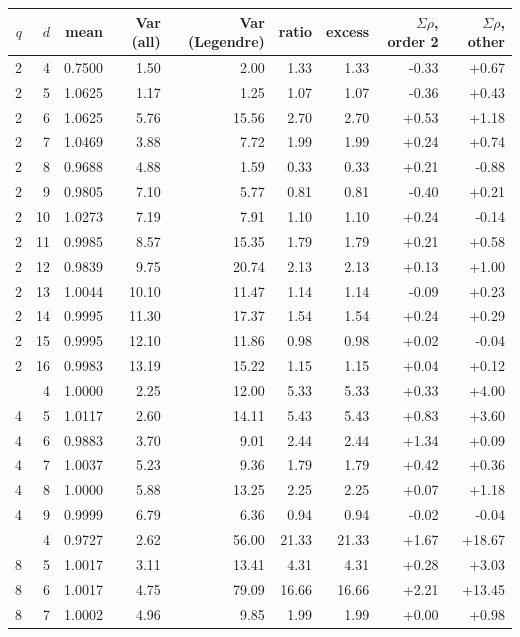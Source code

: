\begin{tabular}{rrrrrrrrr}
\toprule
$q$ & $d$ & mean & Var (all) & Var (Legendre) & ratio & excess & $\Sigma\rho$, order 2 & $\Sigma\rho$, other \\
\midrule
2 & 4 & 0.7500 & 1.50 & 2.00 & 1.33 & 1.33 & -0.33 & +0.67 \\
2 & 5 & 1.0625 & 1.17 & 1.25 & 1.07 & 1.07 & -0.36 & +0.43 \\
2 & 6 & 1.0625 & 5.76 & 15.56 & 2.70 & 2.70 & +0.53 & +1.18 \\
2 & 7 & 1.0469 & 3.88 & 7.72 & 1.99 & 1.99 & +0.24 & +0.74 \\
2 & 8 & 0.9688 & 4.88 & 1.59 & 0.33 & 0.33 & +0.21 & -0.88 \\
2 & 9 & 0.9805 & 7.10 & 5.77 & 0.81 & 0.81 & -0.40 & +0.21 \\
2 & 10 & 1.0273 & 7.19 & 7.91 & 1.10 & 1.10 & +0.24 & -0.14 \\
2 & 11 & 0.9985 & 8.57 & 15.35 & 1.79 & 1.79 & +0.21 & +0.58 \\
2 & 12 & 0.9839 & 9.75 & 20.74 & 2.13 & 2.13 & +0.13 & +1.00 \\
2 & 13 & 1.0044 & 10.10 & 11.47 & 1.14 & 1.14 & -0.09 & +0.23 \\
2 & 14 & 0.9995 & 11.30 & 17.37 & 1.54 & 1.54 & +0.24 & +0.29 \\
2 & 15 & 0.9995 & 12.10 & 11.86 & 0.98 & 0.98 & +0.02 & -0.04 \\
2 & 16 & 0.9983 & 13.19 & 15.22 & 1.15 & 1.15 & +0.04 & +0.12 \\
\addlinespace
4 & 4 & 1.0000 & 2.25 & 12.00 & 5.33 & 5.33 & +0.33 & +4.00 \\
4 & 5 & 1.0117 & 2.60 & 14.11 & 5.43 & 5.43 & +0.83 & +3.60 \\
4 & 6 & 0.9883 & 3.70 & 9.01 & 2.44 & 2.44 & +1.34 & +0.09 \\
4 & 7 & 1.0037 & 5.23 & 9.36 & 1.79 & 1.79 & +0.42 & +0.36 \\
4 & 8 & 1.0000 & 5.88 & 13.25 & 2.25 & 2.25 & +0.07 & +1.18 \\
4 & 9 & 0.9999 & 6.79 & 6.36 & 0.94 & 0.94 & -0.02 & -0.04 \\
\addlinespace
8 & 4 & 0.9727 & 2.62 & 56.00 & 21.33 & 21.33 & +1.67 & +18.67 \\
8 & 5 & 1.0017 & 3.11 & 13.41 & 4.31 & 4.31 & +0.28 & +3.03 \\
8 & 6 & 1.0017 & 4.75 & 79.09 & 16.66 & 16.66 & +2.21 & +13.45 \\
8 & 7 & 1.0002 & 4.96 & 9.85 & 1.99 & 1.99 & +0.00 & +0.98 \\
\bottomrule
\end{tabular}